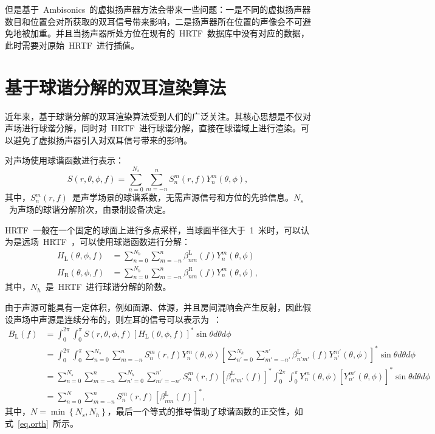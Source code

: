 但是基于~Ambisonics~的虚拟扬声器方法会带来一些问题：一是不同的虚拟扬声器数目和位置会对所获取的双耳信号带来影响，二是扬声器所在位置的声像会不可避免地被加重。并且当扬声器所处方位在现有的~HRTF~数据库中没有对应的数据，此时需要对原始~HRTF~进行插值。

\section{基于球谐分解的双耳渲染算法}\label{sec.SHdecomposition}

近年来，基于球谐分解的双耳渲染算法受到人们的广泛关注。其核心思想是不仅对声场进行球谐分解，同时对~HRTF~进行球谐分解，直接在球谐域上进行渲染。可以避免了虚拟扬声器引入对双耳信号带来的影响。

对声场使用球谐函数进行表示：
\begin{equation}
S(r,\theta,\phi,f) = \sum_{n=0}^{N_{s}}\sum_{m=-n}^{n} S_n^m(r,f)Y_{n}^{m}(\theta,\phi),
\end{equation}
其中，$S_n^m(r,f)$~是声学场景的球谐系数，无需声源信号和方位的先验信息。$N_{s}$~为声场的球谐分解阶次，由录制设备决定。

HRTF~一般在一个固定的球面上进行多点采样，当球面半径大于~1~米时，可以认为是远场~HRTF~，可以使用球谐函数进行分解：
\begin{equation}\label{HRTF_decomposition}
\begin{split}
H_{\text{L}}(\theta,\phi,f) & = \sum_{n=0}^{N_{h}}\sum_{m=-n}^{n} \beta_{nm}^{\text{L}}(f)Y_{n}^{m}(\theta,\phi) \\
H_{\text{R}}(\theta,\phi,f) & = \sum_{n=0}^{N_{h}}\sum_{m=-n}^{n} \beta_{nm}^{\text{R}}(f)Y_{n}^{m}(\theta,\phi),
\end{split}
\end{equation}
其中，$N_{h}$~是~HRTF~进行球谐分解的阶数。

由于声源可能具有一定体积，例如面源、体源，并且房间混响会产生反射，因此假设声场中声源是连续分布的，则左耳的信号可以表示为~：
\begin{align}
B_{\text{L}}(f) &= \int_{0}^{2\pi}\int _{0}^{\pi}S(r,\theta,\phi,f)\left[H_{\text{L}}(\theta,\phi,f)\right]^{*}\sin \theta d\theta d\phi \nonumber \\
&= \int_{0}^{2\pi}\int _{0}^{\pi} \sum_{n=0}^{N_{s}}\sum_{m=-n}^{n} S_n^m(r,f)Y_{n}^{m}(\theta,\phi) \left[  \sum_{n'=0}^{N_{h}}\sum_{m'=-n'}^{n'} \beta_{n'm'}^{\text{L}}(f)Y_{n'}^{m'}(\theta,\phi)\right]^{*}
\sin\theta d\theta d\phi \nonumber \\
&=\sum_{n=0}^{N_{s}}\sum_{m=-n}^{n} \sum_{n'=0}^{N_{h}}\sum_{m'=-n'}^{n'} S_n^m(r,f)\left[\beta_{n'm'}^{\text{L}}(f)\right]^{*}
\int_{0}^{2\pi}\int _{0}^{\pi} Y_{n}^{m}(\theta,\phi)\left[Y_{n'}^{m'}(\theta,\phi)\right]^{*}\sin\theta d\theta d\phi \nonumber \\
&= \sum_{n=0}^{N}\sum_{m=-n}^{n} S_n^m(r,f)\left[\beta_{nm}^{\text{L}}(f)\right]^{*},
\label{eq.BL}
\end{align}
其中，$N=\min \left\{ N_{s},N_{h} \right\}$，最后一个等式的推导借助了球谐函数的正交性，如式~\eqref{eq.orth}~所示。

